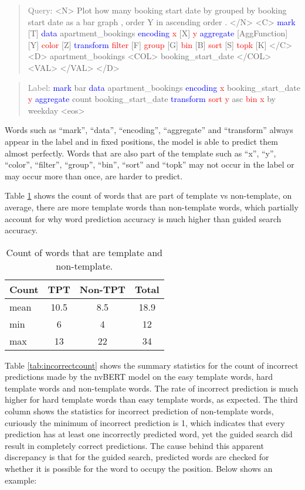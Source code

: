 \documentclass[
	a4paper, %
	10pt, %
	unnumberedsections, %
	twoside, %
]{t0003}
\newcommand{\blue}[1]{\textcolor{blue}{#1}}
\newcommand{\gray}[1]{\textcolor{gray}{#1}}
\newcommand{\red}[1]{\textcolor{red}{#1}}
\begin{document}
\begin{quote}
\gray{Query}: <N> Plot how many booking start date by grouped by booking start date as a bar graph , order Y in ascending order . </N> <C> \blue{mark} [T] \blue{data} apartment\_bookings \blue{ encoding} \red{x} [X] \red{y} \blue{aggregate} [AggFunction] [Y] \red{color} [Z] \blue{transform} \red{filter} [F] \red{group} [G] \red{bin} [B] \red{sort} [S] \red{topk} [K] </C> <D> apartment\_bookings <COL> booking\_start\_date </COL> <VAL> </VAL> </D>
\end{quote}

\begin{quote}
\gray{Label}: \blue{mark} bar \blue{data} apartment\_bookings \blue{encoding} \red{x} booking\_start\_date \red{y} \blue{aggregate} count booking\_start\_date \blue{transform} \red{sort} \red{y} asc \red{bin} \red{x} by weekday <eos>
\end{quote}

Words such as ``mark'', ``data'', ``encoding'', ``aggregate'' and ``transform'' always appear in the label and in fixed positions, the model is able to predict them almost perfectly. Words that are also part of the template such as ``x'', ``y'', ``color'', ``filter'', ``group'', ``bin'', ``sort'' and ``topk'' may not occur in the label or may occur more than once, are harder to predict.

Table \ref{tab:count} shows the count of words that are part of template vs non-template, on average, there are more template words than non-template words, which partially account for why word prediction accuracy is much higher than guided search accuracy.

\begin{table}
	\caption{Count of words that are template and non-template.}
	\centering
	\begin{tabular}{ lccc }
		\toprule
		Count & TPT & Non-TPT & Total \\
		\midrule
		mean & 10.5 & 8.5 & 18.9 \\
min & 6 & 4 & 12 \\
max & 13 & 22 & 34 \\
		\bottomrule
	\end{tabular}
	\label{tab:count}
\end{table}

Table \ref{tab:incorrectcount} shows the summary statistics for the count of incorrect predictions made by the nvBERT model on the easy template words, hard template words and non-template words. The rate of incorrect prediction is much higher for hard template words than easy template words, as expected. The third column shows the statistics for incorrect prediction of non-template words, curiously the minimum of incorrect prediction is 1, which indicates that every prediction has at least one incorrectly predicted word, yet the guided search did result in completely correct predictions. The cause behind this apparent discrepancy is that for the guided search, predicted words are checked for whether it is possible for the word to occupy the position. Below shows an example:
\end{document}
